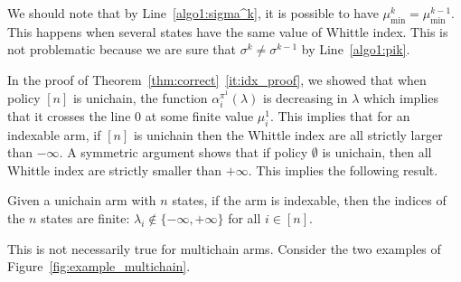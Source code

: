 We should note that by Line~\ref{algo1:sigma^k}, it is possible to have $\mu^k_{\min}=\mu^{k-1}_{\min}$.
This happens when several states have the same value of Whittle index.
This is not problematic because we are sure that $\sigma^k\neq\sigma^{k-1}$ by Line~\ref{algo1:pik}.

In the proof of Theorem~\ref{thm:correct}~\ref{it:idx_proof}, we showed that when policy $[n]$ is unichain, the function $\alpha^{\pi^1}_{i}(\lambda)$ is decreasing in $\lambda$ which implies that it crosses the line $0$ at some finite value $\mu^1_{i}$. This implies that for an indexable arm, if $[n]$ is unichain then the Whittle index are all strictly larger than $-\infty$. A symmetric argument shows that if policy $\emptyset$ is unichain, then all Whittle index are strictly smaller than $+\infty$. This implies the following result. 
\begin{cor}
    Given a unichain arm with $n$ states, if the arm is indexable, then the indices of the $n$ states are finite: $\lambda_i\not\in\{-\infty,+\infty\}$ for all $i\in[n]$.
\end{cor}

This is not necessarily true for multichain arms.
Consider the two examples of Figure~\ref{fig:example_multichain}.

